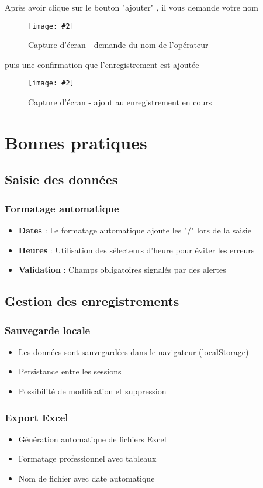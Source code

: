 \documentclass[12pt,a4paper]{report}
\newcommand{\screenshot}[3][]{%
\begin{figure}[H]
\centering
\texttt{[image: \#2]}
\caption{#3}
\end{figure}
}
\begin{document}
Après avoir clique sur le bouton "ajouter" , il vous demande votre nom 

\screenshot{nom_operateur.png}{Capture d'écran - demande du nom de l'opérateur}

puis une confirmation que l'enregistrement est ajoutée

\screenshot{ajout_affichage.png}{Capture d'écran - ajout au enregistrement en cours}

\chapter{Bonnes pratiques}

\section{Saisie des données}

\subsection{Formatage automatique}
\begin{itemize}
    \item \textbf{Dates} : Le formatage automatique ajoute les "/" lors de la saisie
    \item \textbf{Heures} : Utilisation des sélecteurs d'heure pour éviter les erreurs
    \item \textbf{Validation} : Champs obligatoires signalés par des alertes
\end{itemize}


\section{Gestion des enregistrements}

\subsection{Sauvegarde locale}
\begin{itemize}
    \item Les données sont sauvegardées dans le navigateur (localStorage)
    \item Persistance entre les sessions
    \item Possibilité de modification et suppression
\end{itemize}

\subsection{Export Excel}
\begin{itemize}
    \item Génération automatique de fichiers Excel
    \item Formatage professionnel avec tableaux
    \item Nom de fichier avec date automatique
\end{itemize}
\end{document}
